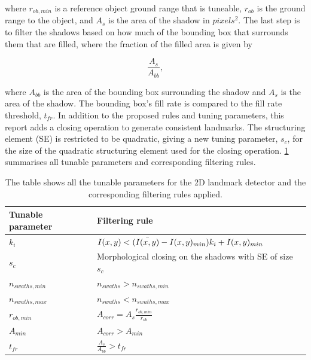 where $r_{ob, min}$ is a reference object ground range that is tuneable, $r_{ob}$ is the ground range to the object, and $A_s$ is the area of the shadow in $pixels^2$. The last step is to filter the shadows based on how much of the bounding box that surrounds them that are filled, where the fraction of the filled area is given by

\begin{equation}
    \frac{A_s}{A_{bb}},
    \label{eq:fill_rate_bb}
\end{equation}

where $A_{bb}$ is the area of the bounding box surrounding the shadow and $A_s$ is the area of the shadow. The bounding box's fill rate is compared to the fill rate threshold, $t_{fr}$. In addition to the proposed rules and tuning parameters, this report adds a closing operation to generate consistent landmarks. The structuring element (SE) is restricted to be quadratic, giving a new tuning parameter, $s_c$, for the size of the quadratic structuring element used for the closing operation. \cref{tab:2D_tuning_rules} summarises all tunable parameters and corresponding filtering rules. 

\begin{table}
    \centering
    \caption{The table shows all the tunable parameters for the 2D landmark detector and the corresponding filtering rules applied.}
    \begin{tabular}{ll}
        \hline
        \textbf{Tunable parameter} & \textbf{Filtering rule}                            \\ \hline
        $k_i$             & $I(x,y) < (\Bar{I(x,y)} - I(x,y)_{min}) k_i + I(x,y)_{min}$ \\ 
        $s_c$             & Morphological closing on the shadows with SE of size $s_c$  \\ 
        $n_{swaths,min}$  & $n_{swaths} > n_{swaths,min}$                               \\ 
        $n_{swaths,max}$  & $n_{swaths} < n_{swaths,max}$                               \\ 
        $r_{ob,min}$      & $A_{corr} = A_s\frac{r_{ob,min}}{r_{ob}}$                   \\ 
        $A_{min}$         & $A_{corr} > A_{min}$                                        \\ 
        $t_{fr}$          & $\frac{A_s}{A_{bb}} > t_{fr}$                               \\ 
        \hline
    \end{tabular}
    \label{tab:2D_tuning_rules}
\end{table}

